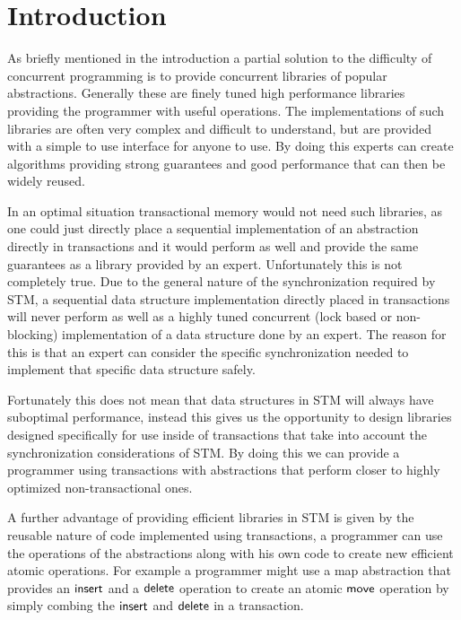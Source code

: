 \section{Introduction}

As briefly mentioned in the introduction a partial solution to the difficulty of concurrent programming
is to provide concurrent libraries of popular abstractions.
Generally these are finely tuned high performance libraries
providing the programmer with useful operations.
The implementations of such libraries are often very complex
and difficult to understand, but are provided with a simple to use
interface for anyone to use.
By doing this experts can create algorithms providing strong guarantees
and good performance that can then be widely reused.

In an optimal situation transactional memory would not need such libraries,
as one could just directly place a sequential implementation of an abstraction
directly in transactions and it would perform as well and provide the same
guarantees as a library provided by an expert.
Unfortunately this is not completely true.
Due to the general nature
of the synchronization required by STM, a sequential data structure implementation directly
placed in transactions will never perform as well as a highly tuned concurrent
(lock based or non-blocking) implementation of a data structure done by an expert.
The reason for this is that an expert can consider the specific synchronization needed to implement
that specific data structure safely.

Fortunately this does not mean that data structures in STM will always have suboptimal performance,
instead this gives us the opportunity to design libraries designed specifically for use inside
of transactions that take into account the synchronization considerations
of STM.
By doing this we can provide a programmer using transactions with abstractions that perform closer
to highly optimized non-transactional ones.

A further advantage of providing efficient libraries in STM is given by the reusable nature of code implemented using
transactions, a programmer can use the operations of the abstractions along with his own code
to create new efficient atomic operations.
For example a programmer might use a map abstraction that provides an $\lit{insert}$ and a $\lit{delete}$ operation
to create an atomic $\lit{move}$ operation by simply combing the $\lit{insert}$ and $\lit{delete}$ in a transaction.

